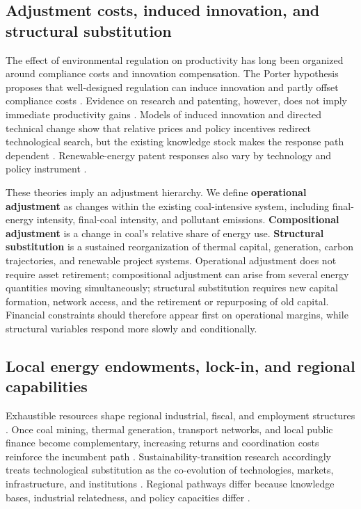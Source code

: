 \documentclass[11pt]{article}
\begin{document}
\subsection{Adjustment costs, induced innovation, and structural substitution}

The effect of environmental regulation on productivity has long been organized around compliance costs and innovation compensation. The Porter hypothesis proposes that well-designed regulation can induce innovation and partly offset compliance costs \parencite{portervanderlinde1995}. Evidence on research and patenting, however, does not imply immediate productivity gains \parencite{jaffepalmer1997}. Models of induced innovation and directed technical change show that relative prices and policy incentives redirect technological search, but the existing knowledge stock makes the response path dependent \parencite{popp2002,acemogluetal2012,aghionetal2016}. Renewable-energy patent responses also vary by technology and policy instrument \parencite{johnstoneetal2010}.

These theories imply an adjustment hierarchy. We define \textbf{operational adjustment} as changes within the existing coal-intensive system, including final-energy intensity, final-coal intensity, and pollutant emissions. \textbf{Compositional adjustment} is a change in coal's relative share of energy use. \textbf{Structural substitution} is a sustained reorganization of thermal capital, generation, carbon trajectories, and renewable project systems. Operational adjustment does not require asset retirement; compositional adjustment can arise from several energy quantities moving simultaneously; structural substitution requires new capital formation, network access, and the retirement or repurposing of old capital. Financial constraints should therefore appear first on operational margins, while structural variables respond more slowly and conditionally.

\subsection{Local energy endowments, lock-in, and regional capabilities}

Exhaustible resources shape regional industrial, fiscal, and employment structures \parencite{hotelling1931,auty1993,sachswarner2001}. Once coal mining, thermal generation, transport networks, and local public finance become complementary, increasing returns and coordination costs reinforce the incumbent path \parencite{arthur1989,david1985,unruh2000}. Sustainability-transition research accordingly treats technological substitution as the co-evolution of technologies, markets, infrastructure, and institutions \parencite{geels2002,markardetal2012}. Regional pathways differ because knowledge bases, industrial relatedness, and policy capacities differ \parencite{hansencoenen2015,boschma2017}.
\end{document}
